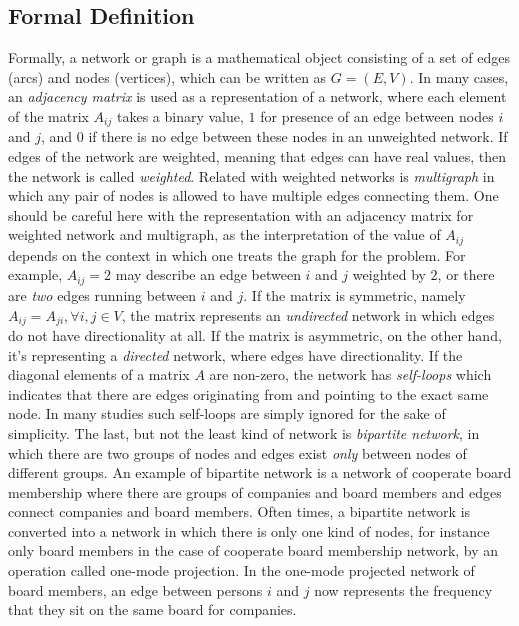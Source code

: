 \documentclass{article}
\begin{document}
	\subsection{Formal Definition}
	Formally, a network or graph is a mathematical object consisting of a set of edges (arcs) and nodes (vertices), which can be written as $G = (E,V)$. In many cases, an \textit{adjacency matrix} is used as a representation of a network, where each element of the matrix $A_{ij}$ takes a binary value, $1$ for presence of an edge between nodes $i$ and $j$, and $0$ if there is no edge between these nodes in an unweighted network.  If edges of the network are weighted, meaning that  edges can have real values, then the network is called \textit{weighted}. Related with weighted networks is \textit{multigraph} in which any pair of nodes is allowed to have multiple edges connecting them. One should be careful here with the representation with an adjacency matrix for weighted network and multigraph, as the interpretation of the value of $A_{ij}$ depends on the context in which one treats the graph for the problem. For example, $A_{ij} = 2$ may describe an edge between $i$ and $j$ weighted by $2$, or there are \textit{two} edges running between $i$ and $j$. If the matrix is symmetric, namely $A_{ij} = A_{ji},  \forall i,j \in V$, the matrix represents an \textit{undirected} network in which edges do not have directionality at all. If the matrix is asymmetric, on the other hand, it's representing a \textit{directed} network, where edges have directionality. If the diagonal elements of a matrix $A$ are non-zero, the network has \textit{self-loops} which indicates that there are edges originating from and pointing to the exact same node. In many studies such self-loops are simply ignored for the sake of simplicity. The last, but not the least kind of network is \textit{bipartite network}, in which there are two groups of nodes and edges exist \textit{only} between nodes of different groups. An example of bipartite network is a network of cooperate board membership where there are groups of companies and board members and edges connect companies and board members. Often times, a bipartite network is converted into a network in which there is only one kind of nodes, for instance only board members in the case of cooperate board membership network, by an operation called one-mode projection. In the one-mode projected network of board members, an edge between persons $i$ and $j$ now represents the frequency that they sit on the same board for companies.
	
\end{document}
